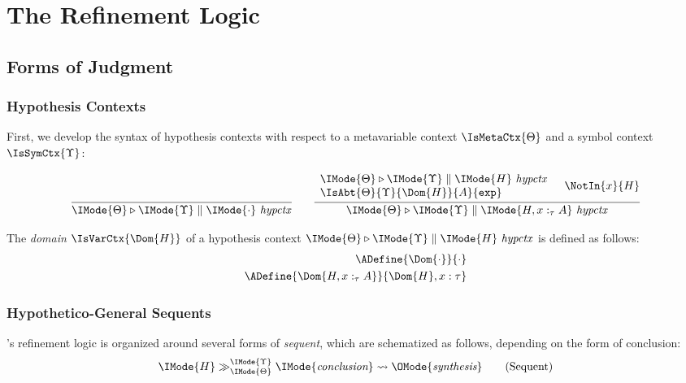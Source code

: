 \chapter{The Refinement Logic}

\newcommand\PRLSequent[5]{
  \IMode{#1}\gg_{\IMode{#2}}^{\IMode{#3}}%
  \IMode{#4}\leadsto%
  \OMode{#5}%
}

\newcommand\GenericPRLSequent[6]{
  [\IMode{#1}]\mid%
  \PRLSequent{#2}{#3}{#4}{#5}{#6}%
}

\newcommand\IsHypCtx[3]{
  \IMode{#1}\triangleright%
  \IMode{#2}\parallel%
  \IMode{#3}\ \mathit{hypctx}%
}

\section{Forms of Judgment}

\subsection{Hypothesis Contexts}
First, we develop the syntax of hypothesis contexts with respect to a
metavariable context $\IsMetaCtx{\Theta}$ and a symbol context
$\IsSymCtx{\Upsilon}$:

\[
  \infer{
    \IsHypCtx{\Theta}{\Upsilon}{\cdot}
  }{}
  \qquad
  \infer{
    \IsHypCtx{\Theta}{\Upsilon}{H, x:_\tau A}
  }{
    \begin{array}{l}
      \IsHypCtx{\Theta}{\Upsilon}{H}\\
      \IsAbt{\Theta}{\Upsilon}{\Dom{H}}{A}{\AbtSortExp}
    \end{array}&
    \NotIn{x}{H}
  }
\]

The \emph{domain} $\IsVarCtx{\Dom{H}}$ of a hypothesis context
$\IsHypCtx{\Theta}{\Upsilon}{H}$ is defined as follows:
\begin{align*}
  \ADefine{\Dom{\cdot}}{\cdot}\\
  \ADefine{\Dom{H,x:_\tau A}}{\Dom{H}, x : \tau}
\end{align*}

\subsection{Hypothetico-General Sequents}

\RedPRL's refinement logic is organized around several forms of \emph{sequent},
which are schematized as follows, depending on the form of conclusion:
\[
  \PRLSequent{H}{\Theta}{\Upsilon}{\textit{conclusion}}{\textit{synthesis}}
  \tag{Sequent}
\]

